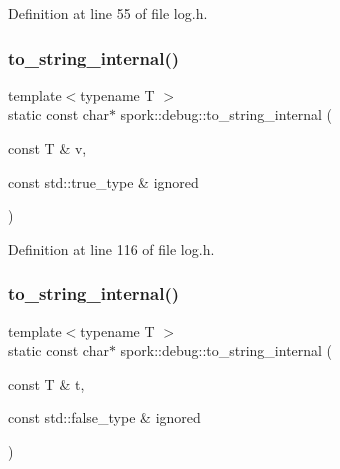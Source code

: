 Definition at line 55 of file log.\+h.

\mbox{\label{namespacespork_1_1debug_a8fd0aebbc584e9053a2e81ad7f207c14}} 
\subsubsection{\texorpdfstring{to\+\_\+string\+\_\+internal()}{to\_string\_internal()}\hspace{0.1cm}{\footnotesize\ttfamily [1/2]}}
{\footnotesize\ttfamily template$<$typename T $>$ \\
static const char$\ast$ spork\+::debug\+::to\+\_\+string\+\_\+internal (\begin{DoxyParamCaption}\item[{const T \&}]{v,  }\item[{const std\+::true\+\_\+type \&}]{ignored }\end{DoxyParamCaption})\hspace{0.3cm}{\ttfamily [static]}}



Definition at line 116 of file log.\+h.

\mbox{\label{namespacespork_1_1debug_a2d49d37a5a0aa7df3d3b18376406be42}} 
\subsubsection{\texorpdfstring{to\+\_\+string\+\_\+internal()}{to\_string\_internal()}\hspace{0.1cm}{\footnotesize\ttfamily [2/2]}}
{\footnotesize\ttfamily template$<$typename T $>$ \\
static const char$\ast$ spork\+::debug\+::to\+\_\+string\+\_\+internal (\begin{DoxyParamCaption}\item[{const T \&}]{t,  }\item[{const std\+::false\+\_\+type \&}]{ignored }\end{DoxyParamCaption})\hspace{0.3cm}{\ttfamily [static]}}



